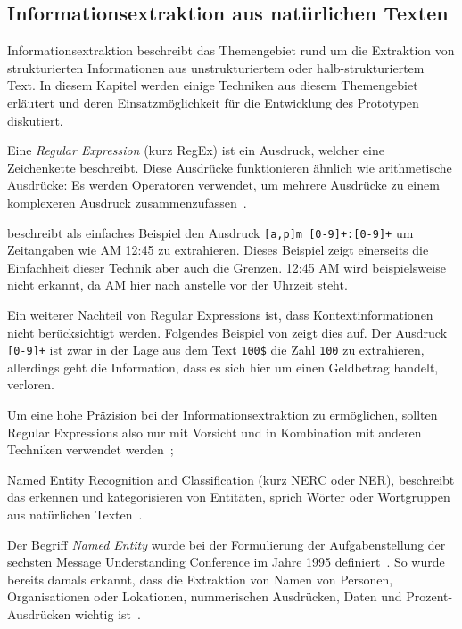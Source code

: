 \subsection{Informationsextraktion aus natürlichen Texten}
\label{chap:ner}


Informationsextraktion beschreibt das Themengebiet rund um die Extraktion von strukturierten Informationen aus unstrukturiertem oder halb-strukturiertem Text. In diesem Kapitel werden einige Techniken aus diesem Themengebiet erläutert und deren Ein\-satz\-mög\-lich\-keit für die Entwicklung des Prototypen diskutiert.

Eine \textit{Regular Expression} (kurz RegEx) ist ein Ausdruck, welcher eine Zeichenkette beschreibt. Diese Ausdrücke funktionieren ähnlich wie arithmetische Ausdrücke: Es werden Operatoren verwendet, um mehrere Ausdrücke zu einem komplexeren Ausdruck zusammenzufassen~\autocite{Xiao2004}.

\textcite{Xiao2004} beschreibt als einfaches Beispiel den Ausdruck \texttt{[a,p]m [0-9]+:[0-9]+} um Zeitangaben wie AM 12:45 zu extrahieren. Dieses Beispiel zeigt einerseits die Einfachheit dieser Technik aber auch die Grenzen. 12:45 AM wird beispielsweise nicht erkannt, da AM hier nach anstelle vor der Uhrzeit steht. 

Ein weiterer Nachteil von Regular Expressions ist, dass Kontextinformationen nicht be\-rück\-sich\-tigt werden. Folgendes Beispiel von \textcite{Xiao2004} zeigt dies auf. Der Ausdruck \texttt{[0-9]+} ist zwar in der Lage aus dem Text \texttt{100\$} die Zahl \texttt{100} zu extrahieren, allerdings geht die Information, dass es sich hier um einen Geldbetrag handelt, verloren.

Um eine hohe Präzision bei der Informationsextraktion zu ermöglichen, sollten Regular Expressions also nur mit Vorsicht und in Kombination mit anderen Techniken verwendet werden~\autocite{Xiao2004};

Named Entity Recognition and Classification (kurz NERC oder NER), beschreibt das erkennen und kategorisieren von Entitäten, sprich Wörter oder Wortgruppen aus natürlichen Texten~\autocite{Nadeau2007}.

Der Begriff \textit{Named Entity} wurde bei der Formulierung der Aufgabenstellung der sechsten Message Understanding Conference im Jahre 1995 definiert~\autocite{Borthwick1998}. So wurde bereits damals erkannt, dass die Extraktion von Namen von Personen, Organisationen oder Lokationen, nummerischen Ausdrücken, Daten und Prozent-Ausdrücken wichtig ist~\autocite{Nadeau2007}.

